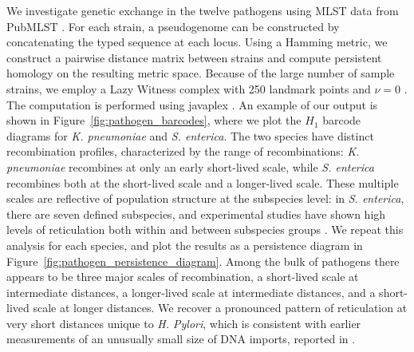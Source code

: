 We investigate genetic exchange in the twelve pathogens using MLST data from PubMLST \cite{Jolley:2010gf}.
For each strain, a pseudogenome can be constructed by concatenating the typed sequence at each locus.
Using a Hamming metric, we construct a pairwise distance matrix between strains and compute persistent homology on the resulting metric space.
Because of the large number of sample strains, we employ a Lazy Witness complex with 250 landmark points and $\nu=0$ \cite{deSilva:2004tg}.
The computation is performed using javaplex \cite{Tausz:2011}.
An example of our output is shown in Figure~\ref{fig:pathogen_barcodes}, where we plot the $H_1$ barcode diagrams for \emph{K. pneumoniae} and \emph{S. enterica}.
The two species have distinct recombination profiles, characterized by the range of recombinations: \emph{K. pneumoniae} recombines at only an early short-lived scale, while \emph{S. enterica} recombines both at the short-lived scale and a longer-lived scale.
These multiple scales are reflective of population structure at the subspecies level: in \emph{S. enterica}, there are seven defined subspecies, and experimental studies have shown high levels of reticulation both within and between subspecies groups \cite{Brown:2003id}.
We repeat this analysis for each species, and plot the results as a persistence diagram in Figure~\ref{fig:pathogen_persistence_diagram}.
Among the bulk of pathogens there appears to be three major scales of recombination, a short-lived scale at intermediate distances, a longer-lived scale at intermediate distances, and a short-lived scale at longer distances.
We recover a pronounced pattern of reticulation at very short distances unique to \emph{H. Pylori}, which is consistent with earlier measurements of an unusually small size of DNA imports, reported in \cite{Falush:2001cd}.

